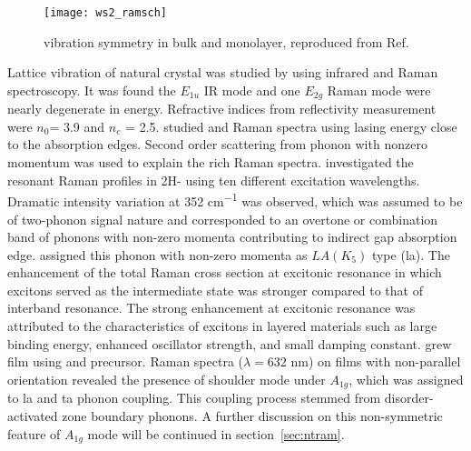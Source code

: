 \begin{figure}[htb]
\centering
\texttt{[image: ws2\_ramsch]}
\caption[ vibration symmetry]{ vibration symmetry in bulk and monolayer, reproduced from Ref.\cite{Ghorbani-Asl2013}}
\label{fig:ws2ramsch}
\end{figure}

Lattice vibration of natural  crystal was studied by \citeauthor{Wieting1971} using infrared and Raman spectroscopy.\cite{Wieting1971} It was found the $E_{1u}$ IR mode and one $E_{2g}$ Raman mode were nearly degenerate in energy. Refractive indices from reflectivity measurement were $n_0$= 3.9 and $n_e$ = 2.5. \citeauthor{Stacy1985} studied  and  Raman spectra using lasing energy close to the absorption edges.\cite{Stacy1985} Second order scattering from phonon with nonzero momentum was used to explain the rich Raman spectra. \citeauthor{Sourisseau1991} investigated the resonant Raman profiles in 2H- using ten different excitation wavelengths.\cite{Sourisseau1991} Dramatic intensity variation at 352 \si{cm^{-1}} was observed, which was assumed to be of two-phonon signal nature and corresponded to an overtone or combination band of phonons with non-zero momenta contributing to indirect gap absorption edge. \citeauthor{Sourisseau1991} assigned this phonon with non-zero momenta as $LA(K_5)$ type (\gls{la}). The enhancement of the total Raman cross section at excitonic resonance in which excitons served as the intermediate state was stronger compared to that of interband resonance. The strong enhancement at excitonic resonance was attributed to the characteristics of excitons in layered materials such as large binding energy, enhanced oscillator strength, and small damping constant.\cite{Zhao2013} \citeauthor{Chung1998} grew  film using  and  precursor.\cite{Chung1998} Raman spectra ($\lambda=632$ nm) on films with non-parallel orientation revealed the presence of shoulder mode under $A_{1g}$, which was assigned to \gls{la} and \gls{ta} phonon coupling. This coupling process stemmed from disorder-activated zone boundary phonons. A further discussion on this non-symmetric feature of $A_{1g}$ mode will be continued in section~\ref{sec:ntram}.


